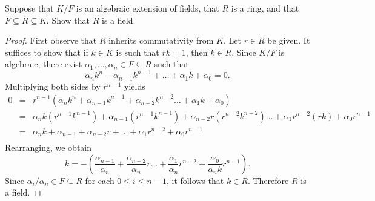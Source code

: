 \documentclass[10pt]{amsart}
\begin{document}
\begin{thm}
  Suppose that $K/F$ is an algebraic extension of fields, that $R$ is a ring, and that $F \subseteq R \subseteq K$.
  Show that $R$ is a field.
  \begin{proof}
    First observe that $R$ inherits commutativity from $K$.
    Let $r \in R$ be given.
    It suffices to show that if $k \in K$ is such that $rk = 1$, then $k \in R$.
    Since $K/F$ is algebraic, there exist $\alpha_1, \ldots, \alpha_n \in F \subseteq R$ such that 
    $$\alpha_n k^n + \alpha_{n-1} k^{n-1} + \ldots + \alpha_1 k + \alpha_0 = 0.$$
    Multiplying both sides by $r^{n-1}$ yields
    \begin{eqnarray*}
      0 &=& r^{n-1}(\alpha_n k^n + \alpha_{n-1} k^{n-1} + \alpha_{n-2} k^{n-2}\ldots + \alpha_1 k + \alpha_0)\\
      &=& \alpha_n k(r^{n-1}k^{n-1}) + \alpha_{n-1} (r^{n-1}k^{n-1}) + \alpha_{n-2} r (r^{n-2} k^{n-2})\ldots + \alpha_1 r^{n-2}(rk) + \alpha_0r^{n-1}\\
      &=& \alpha_n k + \alpha_{n-1} + \alpha_{n-2}r+ \ldots + \alpha_1 r^{n-2} + \alpha_0r^{n-1}\\
    \end{eqnarray*}
    Rearranging, we obtain $$k = -\left(\frac{\alpha_{n-1}}{\alpha_n} + \frac{\alpha_{n-2}}{\alpha_n}r\ldots + \frac{\alpha_1}{\alpha_n} r^{n-2} + \frac{\alpha_0}{\alpha_n k}r^{n-1}\right).$$
    Since $\alpha_i/\alpha_n \in F \subseteq R$ for each $0 \leq i \leq n-1$, it follows that $k \in R$.
    Therefore $R$ is a field.
  \end{proof}
\end{thm}
\end{document}
